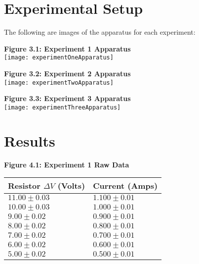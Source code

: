 \documentclass[
	letterpaper, %
	12pt, %
]{CSUniSchoolLabReport}
\begin{document}
\section{Experimental Setup}
The following are images of the apparatus for each experiment:
\begin{center}
    \textbf{Figure 3.1: Experiment 1 Apparatus}\\
    \texttt{[image: experimentOneApparatus]}
\end{center}
\begin{center}
    \textbf{Figure 3.2: Experiment 2 Apparatus}\\
    \texttt{[image: experimentTwoApparatus]}
\end{center}
\begin{center}
    \textbf{Figure 3.3: Experiment 3 Apparatus}\\
    \texttt{[image: experimentThreeApparatus]}
\end{center}

\section{Results}

\begin{center}
    \textbf{Figure 4.1: Experiment 1 Raw Data}
\end{center}
\setlength\arrayrulewidth{2pt}
\begin{center}
\begin{tabular}{  | l | l | }
	\hline
	Resistor $\Delta V$ (Volts) & Current (Amps) \\
	\hline
	$11.00\pm0.03$& $1.100\pm0.01$\\
	$10.00\pm0.03$& $1.000\pm0.01$\\
	$9.00\pm0.02$& $0.900\pm0.01$\\
	$8.00\pm0.02$& $0.800\pm0.01$\\
	$7.00\pm0.02$& $0.700\pm0.01$\\
	$6.00\pm0.02$& $0.600\pm0.01$\\
	$5.00\pm0.02$& $0.500\pm0.01$\\
	\hline
\end{tabular}
\end{center}
\end{document}
